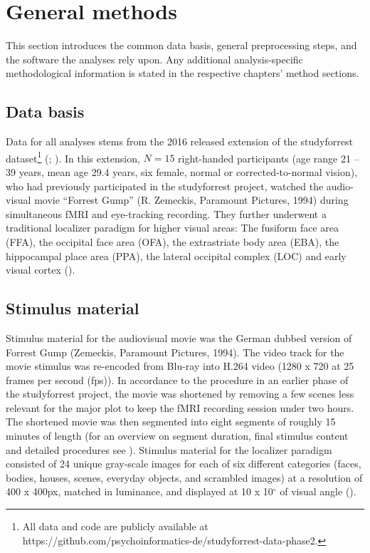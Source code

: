 \documentclass[a4paper, 12pt]{scrreprt}
\begin{document}
\section{General methods}\label{section:generalmethods}

This section introduces the common data basis, general preprocessing steps, and the software the analyses rely upon. Any additional analysis-specific methodological information is stated in the respective chapters' method sections.

\subsection{Data basis}

Data for all analyses stems from the 2016 released extension of the studyforrest dataset\footnote{All data and code are publicly available at https://github.com/psychoinformatics-de/studyforrest-data-phase2.} (\cite{hanke2016studyforrest}; \cite{sengupta2016studyforrest}). In this extension, $N = 15$ right-handed participants (age range 21 – 39 years, mean age 29.4 years, six female, normal or corrected-to-normal vision), who had previously participated in the studyforrest project, watched the audio-visual movie “Forrest Gump” (R. Zemeckis, Paramount Pictures, 1994) during simultaneous fMRI and eye-tracking recording. They further underwent a traditional localizer paradigm for higher visual areas: The fusiform face area (FFA), the occipital face area (OFA), the extrastriate body area (EBA), the hippocampal place area (PPA), the lateral occipital complex (LOC) and early visual cortex (\cite{sengupta2016studyforrest}).

\subsection{Stimulus material}

Stimulus material for the audiovisual movie was the German dubbed version of Forrest Gump (Zemeckis, Paramount Pictures, 1994). The video track for the movie stimulus was re-encoded from Blu-ray into H.264 video (1280 x 720 at 25 frames per second (fps)). In accordance to the procedure in an earlier phase of the studyforrest project, the movie was shortened by removing a few scenes less relevant for the major plot to keep the fMRI recording session under two hours. The shortened movie was then segmented into eight segments of roughly 15 minutes of length (for an overview on segment duration, final stimulus content and detailed procedures see \textcite{hanke2014high}). Stimulus material for the localizer paradigm consisted of 24 unique gray-scale images for each of six different categories (faces, bodies, houses, scenes, everyday objects, and scrambled images) at a resolution of 400 x 400px, matched in luminance, and displayed at 10 x 10$^\circ$ of visual angle (\cite{sengupta2016studyforrest}). 
\end{document}

